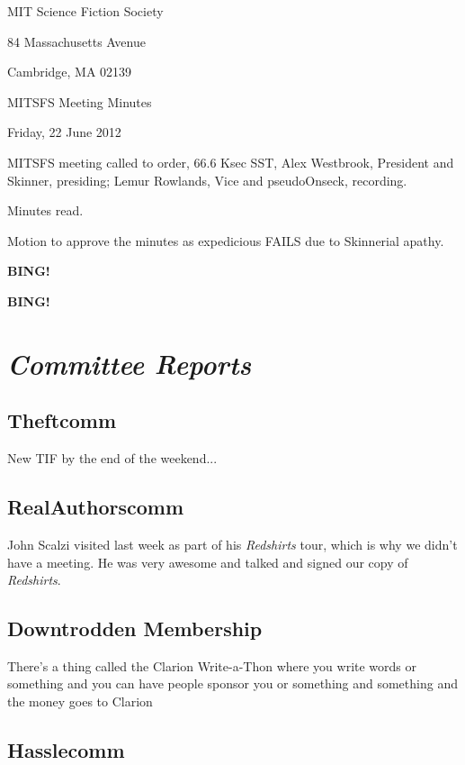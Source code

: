 \documentclass[10pt]{article}
\newcommand{\bing}{{\bf BING!} }
\newcommand{\goto}[1]{\bing \vskip 12pt \section*{{\em{#1}}}}
\newcommand{\skinner}{Alex Westbrook, President and Skinner}
\newcommand{\onseck}{Lemur Rowlands, Vice and pseudoOnseck}
\newcommand{\meetingdate}{Friday, 22 June 2012}
\begin{document}
\begin{center}

MIT Science Fiction Society

84 Massachusetts Avenue

Cambridge, MA 02139

\vspace{12pt}

MITSFS Meeting Minutes

\meetingdate

\end{center}

\vspace{18pt}

\setlength{\parskip}{6pt}

\noindent
MITSFS meeting called to order, 66.6 Ksec SST,
\skinner, presiding; \onseck, recording.

Minutes read.

Motion to approve the minutes as expedicious FAILS due to Skinnerial
apathy.

\bing

\goto{Committee Reports}

\subsection*{Theftcomm}

New TIF by the end of the weekend...

\subsection*{RealAuthorscomm}

John Scalzi visited last week as part of his \emph{Redshirts} tour, which
is why we didn't have a meeting.  He was very awesome and talked and signed
our copy of \emph{Redshirts}.


\subsection*{Downtrodden Membership}

There's a thing called the Clarion Write-a-Thon where you write words
or something and you can have people sponsor you or something and something
and the money goes to Clarion


\subsection*{Hasslecomm}
\end{document}
